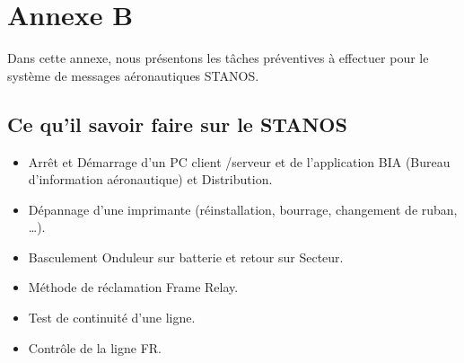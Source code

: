 \chapter*{Annexe B}

\setcounter{section}{0}

Dans cette annexe, nous présentons les tâches préventives à effectuer pour le système de messages aéronautiques STANOS.


\section*{Ce qu’il savoir faire sur le STANOS}
\begin{itemize}
\item Arrêt et Démarrage d’un PC client /serveur et de l’application BIA (Bureau d’information aéronautique)  et Distribution.\\
\item Dépannage d’une imprimante (réinstallation, bourrage, changement de ruban, …). \\
\item Basculement Onduleur sur batterie et retour sur Secteur.\\
\item Méthode de réclamation Frame Relay.\\
\item Test de continuité d’une ligne. \\
\item Contrôle de la ligne FR.\\
\end{itemize}

